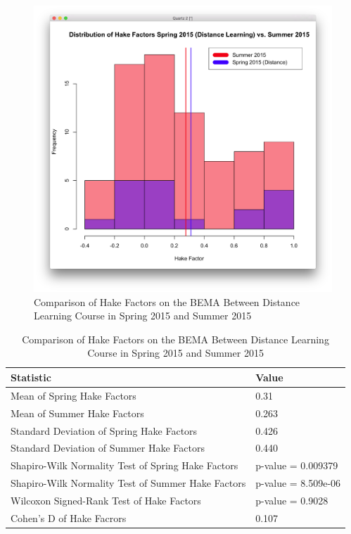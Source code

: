 \begin{figure}
	\centering
	\includegraphics[width=5in]{img/chapter4/hake_su15_vs_sp15d}
	\caption[Comparison of Hake Factors on the BEMA Between Distance Learning Course in Spring 2015 and Summer 2015]{Comparison of Hake Factors on the BEMA Between Distance Learning Course in Spring 2015 and Summer 2015}
  \label{fig:hakeSp15dSu15}
\end{figure}

\begin{small}
\begin{table}
  \centering
  \begin{tabular}{|l|l|}
    \hline
    \textbf{Statistic} & \textbf{Value} \\
	\hline
	Mean of Spring Hake Factors & 0.31 \\
	\hline
	Mean of Summer Hake Factors & 0.263 \\
	\hline
	Standard Deviation of Spring Hake Factors & 0.426 \\
	\hline
	Standard Deviation of Summer Hake Factors & 0.440 \\
	\hline
	Shapiro-Wilk Normality Test of Spring Hake Factors & p-value = 0.009379 \\
	\hline
	Shapiro-Wilk Normality Test of Summer Hake Factors & p-value = 8.509e-06 \\
	\hline
	Wilcoxon Signed-Rank Test of Hake Factors & p-value = 0.9028 \\
	\hline
	Cohen's D of Hake Facrors & 0.107 \\
	\hline
  \end{tabular}
	\caption[Comparison of Hake Factors on the BEMA Between Distance Learning Course in Spring 2015 and Summer 2015]{Comparison of Hake Factors on the BEMA Between Distance Learning Course in Spring 2015 and Summer 2015}
  \label{tab:hakeSp15dSu15}
\end{table}
\end{small}

